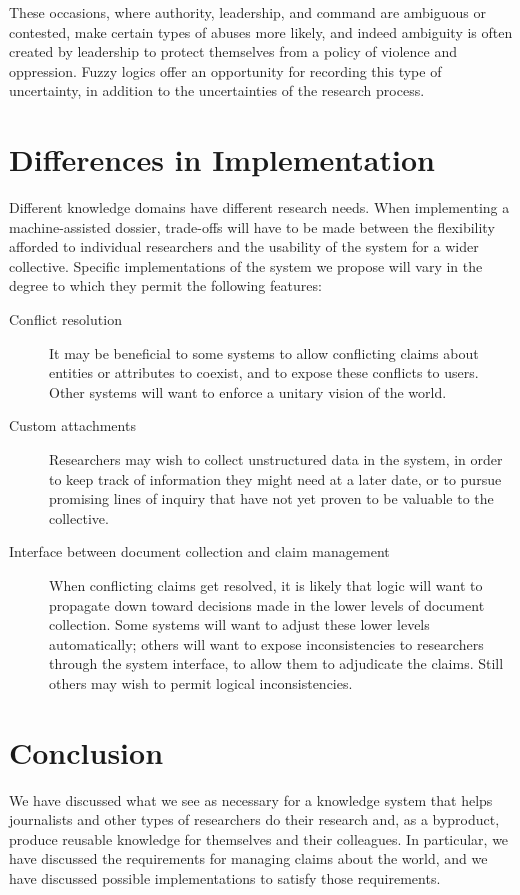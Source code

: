 \documentclass[format=siggraph, review=true]{acmart}
\begin{document}
These occasions, where authority, leadership, and command are
ambiguous or contested, make certain types of abuses more likely, and
indeed ambiguity is often created by leadership to protect themselves
from a policy of violence and oppression. Fuzzy logics offer an
opportunity for recording this type of uncertainty, in addition to
the uncertainties of the research process.

\section{Differences in Implementation}

Different knowledge domains have different research needs. When
implementing a machine-assisted dossier, trade-offs will have to be made
between the flexibility afforded to individual researchers and the
usability of the system for a wider collective. Specific implementations
of the system we propose will vary in the degree to which they permit
the following features:

\begin{description}
  \item [Conflict resolution] It may be beneficial to some systems to
    allow conflicting claims about entities or attributes to coexist,
    and to expose these conflicts to users. Other systems will want
    to enforce a unitary vision of the world.

  \item [Custom attachments] Researchers may wish to collect unstructured
    data in the system, in order to keep track of information they might
    need at a later date, or to pursue promising lines of inquiry that
    have not yet proven to be valuable to the collective.

  \item [Interface between document collection and claim management] When
    conflicting claims get resolved, it is likely that logic will
    want to propagate down toward decisions made in the lower levels
    of document collection. Some systems will want to adjust these lower
    levels automatically; others will want to expose inconsistencies to
    researchers through the system interface, to allow them to adjudicate
    the claims. Still others may wish to permit logical inconsistencies.
\end{description}

\section{Conclusion}
We have discussed what we see as necessary for a knowledge system that
helps journalists and other types of researchers do their research
and, as a byproduct, produce reusable knowledge for themselves and
their colleagues. In particular, we have discussed the requirements
for managing claims about the world, and we have discussed possible
implementations to satisfy those requirements.
\end{document}
